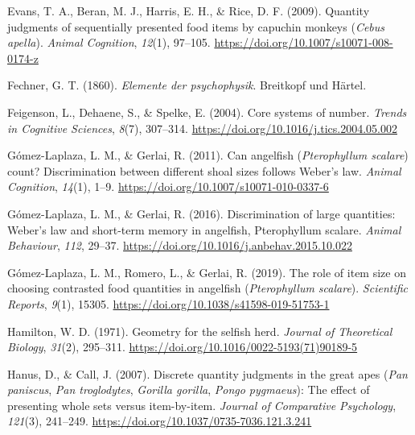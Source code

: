 \documentclass[
  ,pub,floatsintext]{apa6}
\newlength{\cslhangindent}
\newlength{\cslentryspacingunit} %
\newenvironment{CSLReferences}[2] %
 {%
  \setlength{\parindent}{0pt}
  \ifodd #1
  \let\oldpar\par
  \def\par{\hangindent=\cslhangindent\oldpar}
  \fi
  \setlength{\parskip}{#2\cslentryspacingunit}
 }%
 {}
\begin{document}
\begin{CSLReferences}{1}{0}
\leavevmode{}%
Evans, T. A., Beran, M. J., Harris, E. H., \& Rice, D. F. (2009). Quantity judgments of sequentially presented food items by capuchin monkeys (\emph{{Cebus} apella}). \emph{Animal Cognition}, \emph{12}(1), 97--105. \url{https://doi.org/10.1007/s10071-008-0174-z}

\leavevmode{}%
Fechner, G. T. (1860). \emph{Elemente der psychophysik}. Breitkopf und Härtel.

\leavevmode{}%
Feigenson, L., Dehaene, S., \& Spelke, E. (2004). Core systems of number. \emph{Trends in Cognitive Sciences}, \emph{8}(7), 307--314. \url{https://doi.org/10.1016/j.tics.2004.05.002}

\leavevmode{}%
Gómez-Laplaza, L. M., \& Gerlai, R. (2011). Can angelfish (\emph{{Pterophyllum} scalare}) count? {Discrimination} between different shoal sizes follows {Weber}'s law. \emph{Animal Cognition}, \emph{14}(1), 1--9. \url{https://doi.org/10.1007/s10071-010-0337-6}

\leavevmode{}%
Gómez-Laplaza, L. M., \& Gerlai, R. (2016). Discrimination of large quantities: {Weber}'s law and short-term memory in angelfish, {Pterophyllum} scalare. \emph{Animal Behaviour}, \emph{112}, 29--37. \url{https://doi.org/10.1016/j.anbehav.2015.10.022}

\leavevmode{}%
Gómez-Laplaza, L. M., Romero, L., \& Gerlai, R. (2019). The role of item size on choosing contrasted food quantities in angelfish (\emph{{Pterophyllum} scalare}). \emph{Scientific Reports}, \emph{9}(1), 15305. \url{https://doi.org/10.1038/s41598-019-51753-1}

\leavevmode{}%
Hamilton, W. D. (1971). Geometry for the selfish herd. \emph{Journal of Theoretical Biology}, \emph{31}(2), 295--311. \url{https://doi.org/10.1016/0022-5193(71)90189-5}

\leavevmode{}%
Hanus, D., \& Call, J. (2007). Discrete quantity judgments in the great apes (\emph{{Pan} paniscus}, \emph{{Pan} troglodytes}, \emph{{Gorilla} gorilla}, \emph{{Pongo} pygmaeus}): {The} effect of presenting whole sets versus item-by-item. \emph{Journal of Comparative Psychology}, \emph{121}(3), 241--249. \url{https://doi.org/10.1037/0735-7036.121.3.241}


\end{CSLReferences}
\end{document}
